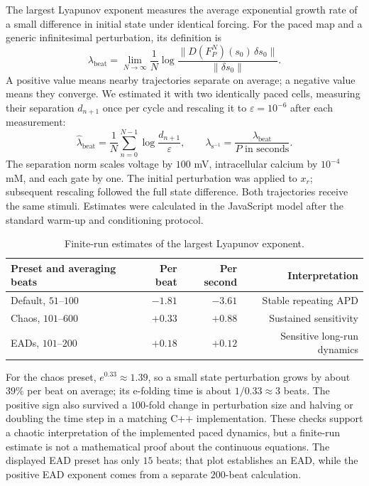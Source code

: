 \documentclass[11pt]{article}
\begin{document}
The largest Lyapunov exponent measures the average exponential growth rate of a small difference in initial state under identical forcing. For the paced map and a generic infinitesimal perturbation, its definition is
\begin{equation}
 \lambda_{\mathrm{beat}}=\lim_{N\to\infty}\frac{1}{N}
 \log\frac{\|D(F_P^{N})(s_0)\,\delta s_0\|}{\|\delta s_0\|}.
\end{equation}
A positive value means nearby trajectories separate on average; a negative value means they converge. We estimated it with two identically paced cells, measuring their separation $d_{n+1}$ once per cycle and rescaling it to $\varepsilon=10^{-6}$ after each measurement:
\begin{equation}
 \widehat\lambda_{\mathrm{beat}}=\frac{1}{N}\sum_{n=0}^{N-1}
 \log\frac{d_{n+1}}{\varepsilon},\qquad
 \lambda_{\mathrm{s}^{-1}}=\frac{\lambda_{\mathrm{beat}}}{P\text{ in seconds}}.
\end{equation}
The separation norm scales voltage by $100$ mV, intracellular calcium by $10^{-4}$ mM, and each gate by one. The initial perturbation was applied to $x_r$; subsequent rescaling followed the full state difference. Both trajectories receive the same stimuli. Estimates were calculated in the JavaScript model after the standard warm-up and conditioning protocol.

\begin{table}[H]
\centering
\caption{Finite-run estimates of the largest Lyapunov exponent.}
\begin{tabular}{lrrr}
\toprule
Preset and averaging beats & Per beat & Per second & Interpretation \\
\midrule
Default, $51$--$100$ & $-1.81$ & $-3.61$ & Stable repeating APD \\
Chaos, $101$--$600$ & $+0.33$ & $+0.88$ & Sustained sensitivity \\
EADs, $101$--$200$ & $+0.18$ & $+0.12$ & Sensitive long-run dynamics \\
\bottomrule
\end{tabular}
\end{table}

For the chaos preset, $e^{0.33}\approx1.39$, so a small state perturbation grows by about $39\%$ per beat on average; its e-folding time is about $1/0.33\approx3$ beats. The positive sign also survived a $100$-fold change in perturbation size and halving or doubling the time step in a matching C++ implementation. These checks support a chaotic interpretation of the implemented paced dynamics, but a finite-run estimate is not a mathematical proof about the continuous equations. The displayed EAD preset has only $15$ beats; that plot establishes an EAD, while the positive EAD exponent comes from a separate $200$-beat calculation.
\end{document}
